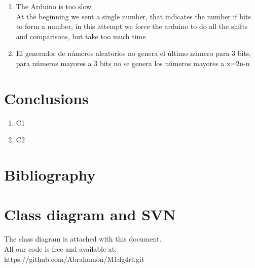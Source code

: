 \documentclass[twocolumn]{IEEEtran}
\begin{document}
\begin{enumerate}
	\item The Arduino is too slow\\
    At the beginning we sent a single number, that indicates the number if bits to form a number, in 
    this attempt we force the arduino to do all the shifts and comparisons, but take too much time 
    
    \item El generador de números aleatorios no genera el último número para 3 bits, 
    para números mayores a 3 bits no se genera los números mayores a x=2n-n\\
	
\end{enumerate}

\section{Conclusions}
\begin{enumerate}
    \item C1
    \item C2
\end{enumerate}



\section{Bibliography}

\section{Class diagram and SVN}

	The class diagram is attached with this document.\\
    
    All our code is free and available at:\\ https://github.com/Abrahamon/M1dg4rt.git \\ 



\end{document}
